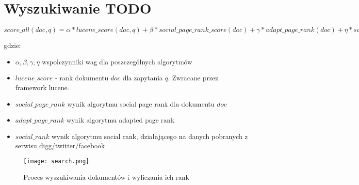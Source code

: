 \section{Wyszukiwanie TODO}

$score\_all(doc, q) = \alpha * lucene\_score(doc, q) + \beta * social\_page\_rank\_score(doc) + \gamma * adapt\_page\_rank(doc) + \eta * social\_rank(doc)$

gdzie:

\begin{itemize}
\item $\alpha, \beta, \gamma, \eta$ wspolczynniki wag dla poszczególnych algorytmów
\item $lucene\_score$ - rank dokumentu $doc$ dla zapytania $q$. Zwracane przez framework lucene.
\item $social\_page\_rank$ wynik algorytmu social page rank dla dokumentu $doc$
\item $adapt\_page\_rank$ wynik algorytmu adapted page rank
\item $social\_rank$ wynik algorytmu social rank, działającego na danych pobranych z serwisu digg/twitter/facebook
\end{itemize}

\begin{figure}[htb]

\texttt{[image: search.png]}
\caption{Proces wyszukiwania dokumentów i wyliczania ich rank}
\label{fig:search_fig}
\end{figure}

